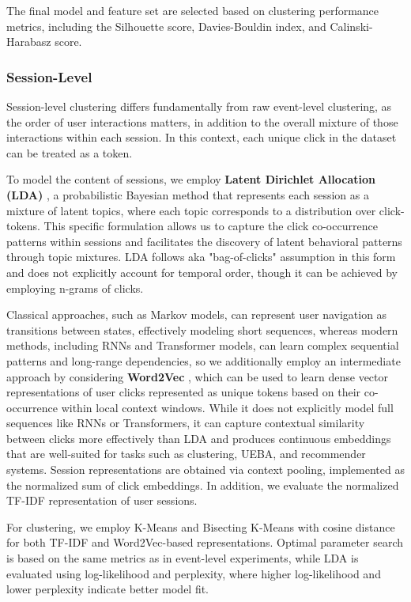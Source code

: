 \documentclass[a4paper,oneside,12pt]{book}
\begin{document}
The final model and feature set are selected based on clustering performance metrics, including the Silhouette score, Davies-Bouldin index, and Calinski-Harabasz score.

\subsubsection{Session-Level}

Session-level clustering differs fundamentally from raw event-level clustering, as the order of user interactions matters, in addition to the overall mixture of those interactions within each session. In this context, each unique click in the dataset can be treated as a token.

To model the content of sessions, we employ \textbf{Latent Dirichlet Allocation (LDA)} \cite{lda}, a probabilistic Bayesian method that represents each session as a mixture of latent topics, where each topic corresponds to a distribution over click-tokens. This specific formulation allows us to capture the click co-occurrence patterns within sessions and facilitates the discovery of latent behavioral patterns through topic mixtures. LDA follows aka "bag-of-clicks" assumption in this form and does not explicitly account for temporal order, though it can be achieved by employing n-grams of clicks.

Classical approaches, such as Markov models, can represent user navigation as transitions between states, effectively modeling short sequences, whereas modern methods, including RNNs and Transformer models, can learn complex sequential patterns and long-range dependencies, so we additionally employ an intermediate approach by considering \textbf{Word2Vec} \cite{mikolov2013word2vec}, which can be used to learn dense vector representations of user clicks represented as unique tokens based on their co-occurrence within local context windows. While it does not explicitly model full sequences like RNNs or Transformers, it can capture contextual similarity between clicks more effectively than LDA and produces continuous embeddings that are well-suited for tasks such as clustering, UEBA, and recommender systems. Session representations are obtained via context pooling, implemented as the normalized sum of click embeddings. In addition, we evaluate the normalized TF-IDF \cite{SALTON1988513} representation of user sessions. 

For clustering, we employ K-Means and Bisecting K-Means with cosine distance for both TF-IDF and Word2Vec-based representations. Optimal parameter search is based on the same metrics as in event-level experiments, while LDA is evaluated using log-likelihood and perplexity, where higher log-likelihood and lower perplexity indicate better model fit.
\end{document}
